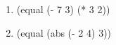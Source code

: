 \begin{enumerate}
	\newpage
	\item (equal (- 7 3) (* 3 2))
	\begin{figure}[H]
	\end{figure}

	\item (equal (abs (- 2 4) 3)) 
	\begin{figure}[H]
	\end{figure}
\end{enumerate}

